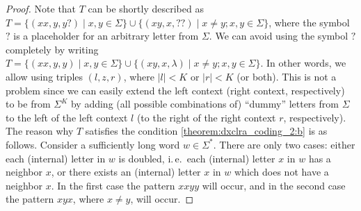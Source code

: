 \begin{proof}
Note that $T$ can be shortly described as $T = \{ (xx, y, y?) \mid x, y \in \Sigma \} \cup \{ (xy, x, ??) \mid x \neq y; x, y \in \Sigma \}$,  where the symbol $?$ is a placeholder for an arbitrary letter from $\Sigma$. We can avoid using the symbol $?$ completely by writing $T = \{ (xx, y, y) \mid x, y \in \Sigma \} \cup \{ (xy, x, \lambda) \mid x \neq y; x, y \in \Sigma \}$. In other words, we allow using triples $(l, z, r)$, where $|l| < K$ or $|r| < K$ (or both). This is not a problem since we can easily extend the left context (right context, respectively) to be from $\Sigma^K$ by adding (all possible combinations of) ``dummy'' letters from $\Sigma$ to the left of the left context $l$ (to the right of the right context $r$, respectively). The reason why $T$ satisfies the condition \ref{theorem:dxclra_coding_2:b} is as follows. Consider a sufficiently long word $w \in \Sigma^*$. There are only two cases: either each (internal) letter in $w$ is doubled, i.\,e.\ each (internal) letter $x$ in $w$ has a neighbor $x$, or there exists an (internal) letter $x$ in $w$ which does not have a neighbor $x$. In the first case the pattern $xxyy$ will occur, and in the second case the pattern $xyx$, where $x \neq y$, will occur.


\end{proof}
